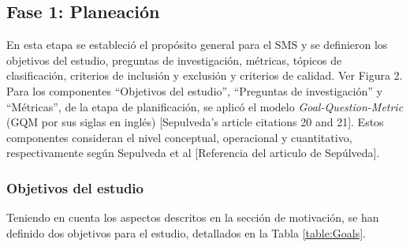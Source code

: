 \subsection{Fase 1: Planeación}\label{sec:planeacion}
En esta etapa se estableció el propósito general para el SMS y se definieron los objetivos del estudio, preguntas de investigación, métricas, tópicos de clasificación, criterios de inclusión y exclusión y criterios de calidad. Ver Figura 2.
Para los componentes ``Objetivos del estudio'', ``Preguntas de investigación'' y ``Métricas'', de la etapa de planificación, se aplicó el modelo {\itshape Goal-Question-Metric} (GQM por sus siglas en inglés) [Sepulveda's article citations 20 and 21]. Estos componentes consideran el nivel conceptual, operacional y cuantitativo, respectivamente según Sepulveda et al [Referencia del articulo de Sepúlveda].

\subsubsection{Objetivos del estudio}
Teniendo en cuenta los aspectos descritos en la sección de motivación, se han definido dos objetivos para el estudio, detallados en la Tabla \ref{table:Goals}.

